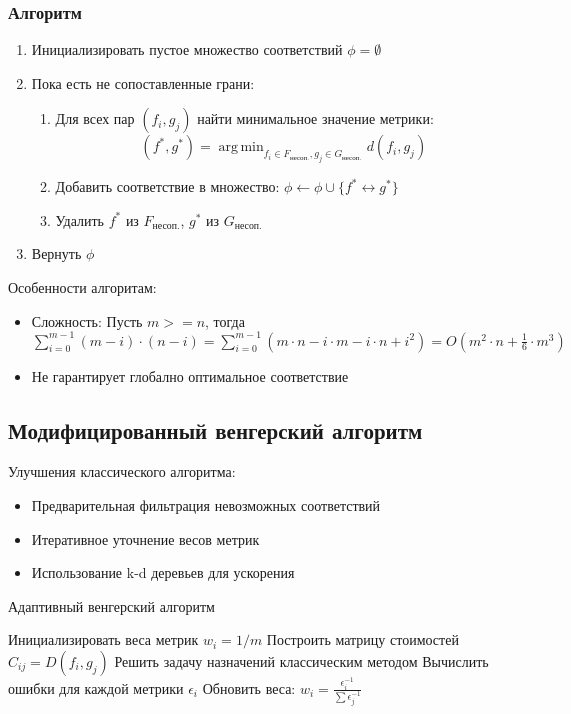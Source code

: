 \documentclass[a4paper,14pt]{extarticle}
\DeclareMathOperator*{\argmin}{arg\,min}
\begin{document}
\subsubsection{Алгоритм}
\begin{enumerate}
    \item Инициализировать пустое множество соответствий $\phi = \emptyset$
    \item Пока есть не сопоставленные грани:
    \begin{enumerate}
        \item Для всех пар $(f_i, g_j)$ найти минимальное значение метрики:
            \[ (f^*, g^*) = \argmin_{f_i \in F_{\text{несоп.}}, g_j \in G_{\text{несоп.}}} d(f_i, g_j) \]
        \item Добавить соответствие в множество: $\phi \leftarrow \phi \cup \{f^* \leftrightarrow g^*\}$
        \item Удалить $f^*$ из $F_{\text{несоп.}}$, $g^*$ из $G_{\text{несоп.}}$
    \end{enumerate}
    \item Вернуть $\phi$
\end{enumerate}

Особенности алгоритам:
\begin{itemize}
    \item Сложность:\newline
        Пусть $m >= n$, тогда \newline
        $\sum\limits_{i = 0}^{m - 1}(m - i) \cdot (n - i) = \sum\limits_{i = 0}^{m - 1}(m \cdot n - i \cdot m 
        - i \cdot n + i^2) = O(m^2 \cdot n + \frac{1}{6} \cdot m^3)$
    \item Не гарантирует глобално оптимальное соответствие
\end{itemize}


\subsection{Модифицированный венгерский алгоритм}
Улучшения классического алгоритма:
\begin{itemize}
    \item Предварительная фильтрация невозможных соответствий
    \item Итеративное уточнение весов метрик
    \item Использование k-d деревьев для ускорения
\end{itemize}

\begin{algorithm}[H]
\caption{Адаптивный венгерский алгоритм}\label{hungarian_adaptive}
\begin{algorithmic}[1]
\State Инициализировать веса метрик $w_i = 1/m$
    \State Построить матрицу стоимостей $C_{ij} = D(f_i, g_j)$
    \State Решить задачу назначений классическим методом
    \State Вычислить ошибки для каждой метрики $\epsilon_i$
    \State Обновить веса: $w_i = \frac{\epsilon_i^{-1}}{\sum \epsilon_j^{-1}}$
\EndWhile
\end{algorithmic}
\end{algorithm}
\end{document}
